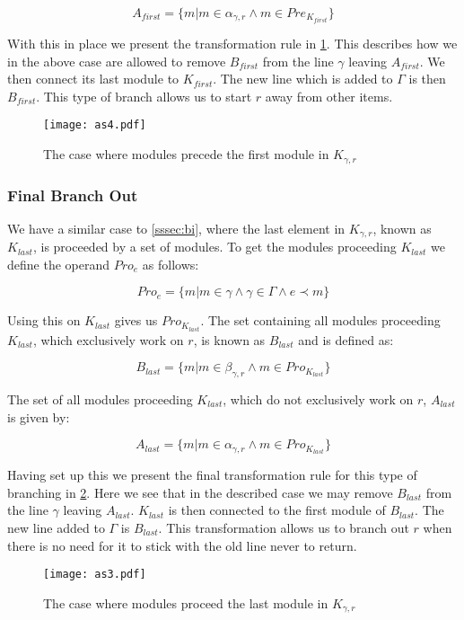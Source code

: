 \[ A_{first} = \{m | m \in \alpha_{\gamma ,r}  \land m \in Pre_{K_{first}} \} \]

With this in place we present the transformation rule in \cref{fig:asbranchin}. This describes how we in the above case are allowed to remove $B_{first}$ from the line $\gamma$ leaving  $A_{first}$. We then connect its last module to $K_{first}$. The new line which is added to $\Gamma$ is then $B_{first}$. This type of branch allows us to start $r$ away from other items.   


\begin{figure}[h]
\centering
\texttt{[image: as4.pdf]}
\caption{The case where modules precede the first module in $K_{\gamma ,r}$}
\label{fig:asbranchin}
\end{figure}

\subsubsection{Final Branch Out}
We have a similar case to \cref{sssec:bi}, where the last element in $K_{\gamma ,r}$, known as $K_{last}$, is proceeded by a set of modules. To get the modules proceeding $K_{last}$ we define the operand $Pro_{e}$ as follows:

\[Pro_{e} = \{m | m \in \gamma \land \gamma \in \Gamma \land e \prec  m \}\]

Using this on $K_{last}$ gives us $Pro_{K_{last}}$. The set containing all modules proceeding $K_{last}$, which exclusively work on $r$, is known as $B_{last}$ and is defined as:

\[B_{last} = \{m | m \in \beta_{\gamma ,r}  \land m \in Pro_{K_{last}} \}\]

The set of all modules proceeding $K_{last}$, which do not exclusively work on $r$, $A_{last}$ is given by:

\[ A_{last} = \{m | m \in \alpha_{\gamma ,r}  \land m \in Pro_{K_{last}} \} \]

Having set up this we present the final transformation rule for this type of branching in \cref{fig:asbranchout}. Here we see that in the described case we may remove $B_{last}$ from the line $\gamma$ leaving  $A_{last}$. $K_{last}$ is then connected to the first module of $B_{last}$. The new line added to $\Gamma$ is $B_{last}$. This transformation allows us to branch out $r$ when there is no need for it to stick with the old line never to return.


\begin{figure}[h]
\centering
\texttt{[image: as3.pdf]}
\caption{The case where modules proceed the last module in $K_{\gamma ,r}$}
\label{fig:asbranchout}
\end{figure}




